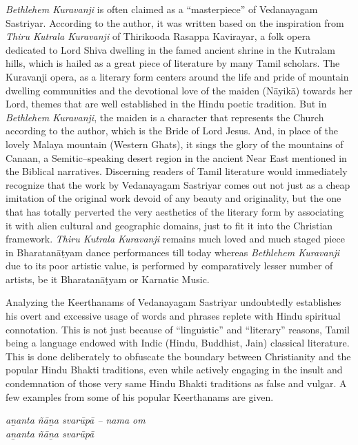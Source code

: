 \textit{Bethlehem Kuravanji} is often claimed as a “masterpiece” of Vedanaya\-gam Sastriyar. According to the author, it was written based on the inspiration from \textit{Thiru Kutrala Kuravanji} of Thirikooda Rasappa Kavirayar, a folk opera dedicated to Lord Shiva dwelling in the famed ancient shrine in the Kutralam hills, which is hailed as a great piece of literature by many Tamil scholars. The Kuravanji opera, as a literary form centers around the life and pride of mountain dwelling communities and the devotional love of the maiden (Nāyikā) towards her Lord, themes that are well established in the Hindu poetic tradition. But in \textit{Bethlehem Kuravanji}, the maiden is a character that represents the Church according to the author, which is the Bride of Lord Jesus. And, in place of the lovely Malaya mountain (Western Ghats), it sings the glory of the mountains of Canaan, a Semitic–speaking desert region in the ancient Near East mentioned in the Biblical narratives. Discerning readers of Tamil literature would immediately recognize that the work by Vedanayagam Sastriyar comes out not just as a cheap imitation of the original work devoid of any beauty and originality, but the one that has totally perverted the very aesthetics of the literary form by associating it with alien cultural and geographic domains, just to fit it into the Christian framework. \textit{Thiru Kutrala Kuravanji }remains much loved and much staged piece in Bharatanāṭyam dance performances till today whereas \textit{Bethlehem Kuravanji }due to its poor artistic value, is performed by comparatively lesser number of artists, be it Bharatanāṭyam or Karnatic Music.

\newpage

Analyzing the Keerthanams of Vedanayagam Sastriyar undoubtedly establishes his overt and excessive usage of words and phrases replete with Hindu spiritual connotation. This is not just because of “linguistic” and “literary” reasons, Tamil being a language endowed with Indic (Hindu, Buddhist, Jain) classical literature. This is done deliberately to obfuscate the boundary between Christianity and the popular Hindu Bhakti traditions, even while actively engaging in the insult and condemnation of those very same Hindu Bhakti traditions as false and vulgar. A few examples from some of his popular Keerthanams are given.

\begin{myquote}
\textit{aṉanta ñāṉa svarūpā – nama om\\ aṉanta ñāṉa svarūpā}
\end{myquote}

